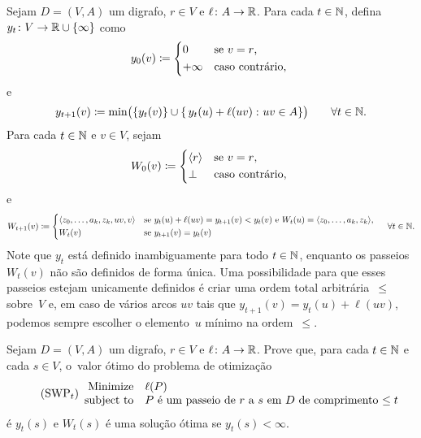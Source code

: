 \documentclass[10pt,reqno]{amsart}
\begin{document}
Sejam \(D = (V,A)\) um digrafo, \(r \in V\) e
\(\ell \colon A \to \mathbb{R}\).  Para cada \(t \in \mathbb{N}\), defina
\(y_t \colon V \to \mathbb{R} \cup \{\infty\}\) como
\begin{equation}
  \label{eq:6}
  y_0(v)
  \coloneqq
  \begin{cases*}
    0       & se \(v = r\),   \\
    +\infty & caso contrário, \\
  \end{cases*}
\end{equation}
e
\begin{equation}
  \label{eq:7}
  y_{t+1}(v)
  \coloneqq
  \min\paren[\big]{
    \set{y_t(v)}
    \cup
    \setst{
      y_t(u) + \ell(uv)
    }{
      uv \in A
    }}
  \qquad
  \forall t \in \Naturals.
\end{equation}
Para cada \(t \in \mathbb{N}\) e \(v \in V\), sejam
\begin{equation}
  \label{eq:8}
  W_0(v)
  \coloneqq
  \begin{cases*}
    \seq{r} & se \(v = r\),   \\
    \bot    & caso contrário, \\
  \end{cases*}
\end{equation}
e
\begin{equation}
  \label{eq:9}
  W_{t+1}(v)
  \coloneqq
  \begin{cases*}
    \seq{z_0,\dotsc,a_k,z_k,uv,v} & se \(y_t(u) + \ell(uv) =
    y_{t+1}(v) < y_t(v)\) e \(W_t(u) = \seq{z_0,\dotsc,a_k,z_k}\), \\
    W_t(v) & se \(y_{t+1}(v) = y_t(v)\) \\
  \end{cases*}
  \quad
  \forall t \in \Naturals.
\end{equation}
Note que \(y_t\) está definido inambiguamente para todo
\(t \in \mathbb{N}\), enquanto os passeios \(W_t(v)\) não são definidos
de forma única.  Uma possibilidade para que esses passeios estejam
unicamente definidos é criar uma ordem total arbitrária~\(\leq\)
sobre~\(V\) e, em caso de vários arcos \(uv\) tais que
\(y_{t+1}(v) = y_t(u) + \ell(uv)\), podemos sempre escolher o
elemento~\(u\) mínimo na ordem~\(\leq\).

\begin{exercise}
  \label{ex:5}
  Sejam \(D = (V,A)\) um digrafo, \(r \in V\) e
  \(\ell \colon A \to \mathbb{R}\).  Prove que, para cada
  \(t \in \mathbb{N}\) e cada \(s \in V\), o~valor ótimo do problema de
  otimização
  \begin{equation}
    \tag{SWP\({}_t\)}
    \begin{array}{{rl}}
      \text{Minimize}   & \ell(P) \\
      \text{subject to} & \text{\(P\) é um passeio de \(r\) a \(s\) em~\(D\) de comprimento \(\leq t\)} \\
    \end{array}
  \end{equation}
  é \(y_t(s)\) e \(W_t(s)\) é uma solução ótima se
  \(y_t(s) < \infty\).
\end{exercise}
\end{document}
